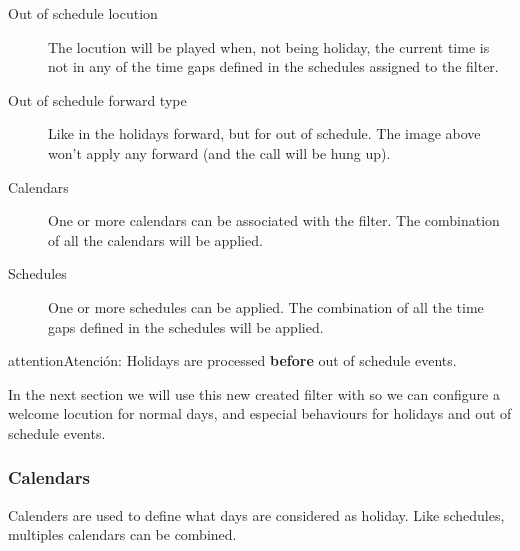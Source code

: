 \documentclass[letterpaper,10pt,spanish]{sphinxmanual}
\begin{document}
\begin{description}
\item[{Out of schedule locution}] \leavevmode{}\label{administration_portal/client/vpbx/routing_tools/external_call_filters:term-out-of-schedule-locution}
The locution will be played when, not being holiday, the current time
is not in any of the time gaps defined in the schedules assigned to the
filter.

\item[{Out of schedule forward type}] \leavevmode{}\label{administration_portal/client/vpbx/routing_tools/external_call_filters:term-out-of-schedule-forward-type}
Like in the holidays forward, but for out of schedule. The image above
won't apply any forward (and the call will be hung up).

\item[{Calendars}] \leavevmode{}\label{administration_portal/client/vpbx/routing_tools/external_call_filters:term-calendars}
One or more calendars can be associated with the filter. The combination
of all the calendars will be applied.

\item[{Schedules}] \leavevmode{}\label{administration_portal/client/vpbx/routing_tools/external_call_filters:term-schedules}
One or more schedules can be applied. The combination of all the time
gaps defined in the schedules will be applied.

\end{description}

\begin{notice}{attention}{Atención:}
Holidays are processed \textbf{before} out of schedule events.
\end{notice}

In the next section we will use this new created filter with
{\hyperref[administration_portal/client/vpbx/ddis:ddis]{}} so we can configure a welcome locution for normal days,
and especial behaviours for holidays and out of schedule events.


\subsubsection{Calendars}
\label{administration_portal/client/vpbx/routing_tools/calendars:calendars}\label{administration_portal/client/vpbx/routing_tools/calendars::doc}
Calenders are used to define what days are considered as holiday. Like
schedules, multiples calendars can be combined.
\end{document}
